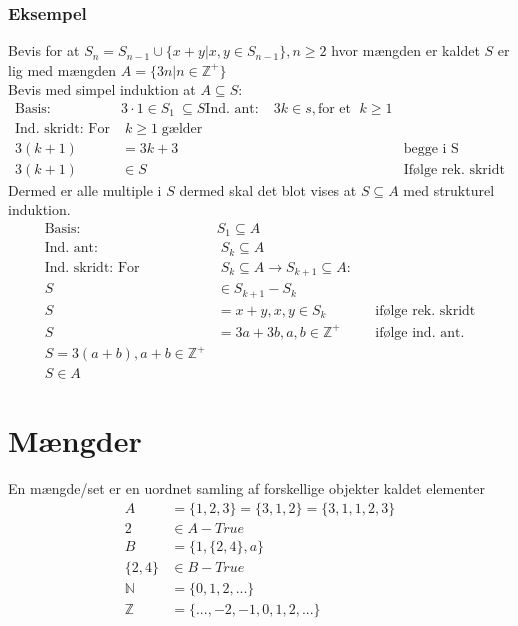 \documentclass[12pt, a4paper]{article}
\begin{document}
				\subsubsection{Eksempel}
					Bevis for at $S_n=S_{n-1}\cup \{x+y|x,y\in S_{n-1}\}, n \geq 2$ hvor mængden er kaldet $S$ er lig med mængden $A=\{3n|n\in\mathbb{Z}^+\}$\\
					Bevis med simpel induktion at $A\subseteq S$:\\
					\begin{align*}
						\text{Basis:}& 3\cdot 1 \in S_1\ \subseteq S
						\text{Ind. ant:}&\;3k\in s, \text{for et }\; k\geq 1\\
						\text{Ind. skridt: For}&\; k\geq 1 \; \text{gælder}\\
						3(k+1)&=3k+3 &&\text{begge i S}\\
						3(k+1)&\in S &&\text{Ifølge rek. skridt}
					\end{align*}
					Dermed er alle multiple i $S$ dermed skal det blot vises at $S\subseteq A$ med strukturel induktion.
					\begin{align*}
						\text{Basis:}& S_1 \subseteq A\\
						\text{Ind. ant:}&\;S_k\subseteq A\\
						\text{Ind. skridt: For}&\; S_k \subseteq A \rightarrow S_{k+1}\subseteq A:\\
						S&\in S_{k+1}-S_k\\
						S&=x+y, x,y\in S_k && \text{ifølge rek. skridt}\\
						S&=3a+3b, a,b\in \mathbb{Z}^+&&\text{ifølge ind. ant.}\\
						S=3(a+b), a+b\in\mathbb{Z}^+\\
						S\in A
					\end{align*}
		\section{Mængder} 
			En mængde/set er en uordnet samling af forskellige objekter kaldet elementer\\
			\begin{align*}
				A&=\{1,2,3\}=\{3,1,2\}=\{3,1,1,2,3\}\\
				2&\in A - True\\
				B&=\{1,\{2,4\},a\}\\
				\{2,4\}&\in B - True\\[5mm]
				\mathbb{N}&=\{0,1,2,...\}\\
				\mathbb{Z}&=\{...,-2,-1,0,1,2,...\}
			\end{align*}
\end{document}
